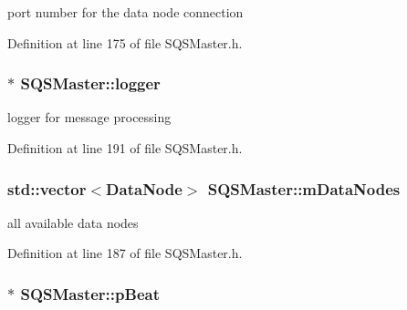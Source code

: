 port number for the data node connection 



\-Definition at line 175 of file \-S\-Q\-S\-Master.\-h.

\hypertarget{classSQSMaster_a2c3525b0f014f112f5d425b1a34152c6}{
\subsubsection[{logger}]{$\ast$ {\bf \-S\-Q\-S\-Master\-::logger}}}\label{dc/d1b/classSQSMaster_a2c3525b0f014f112f5d425b1a34152c6}


logger for message processing 



\-Definition at line 191 of file \-S\-Q\-S\-Master.\-h.

\hypertarget{classSQSMaster_a7f575898ece6a5812819780ca7b0c8c4}{
\subsubsection[{m\-Data\-Nodes}]{\setlength{\rightskip}{0pt plus 5cm}std\-::vector$<${\bf \-Data\-Node}$>$ {\bf \-S\-Q\-S\-Master\-::m\-Data\-Nodes}}}\label{dc/d1b/classSQSMaster_a7f575898ece6a5812819780ca7b0c8c4}


all available data nodes 



\-Definition at line 187 of file \-S\-Q\-S\-Master.\-h.

\hypertarget{classSQSMaster_a9a8824c007d04b97b2334f4d332cd707}{
\subsubsection[{p\-Beat}]{$\ast$ {\bf \-S\-Q\-S\-Master\-::p\-Beat}}}\label{dc/d1b/classSQSMaster_a9a8824c007d04b97b2334f4d332cd707}


